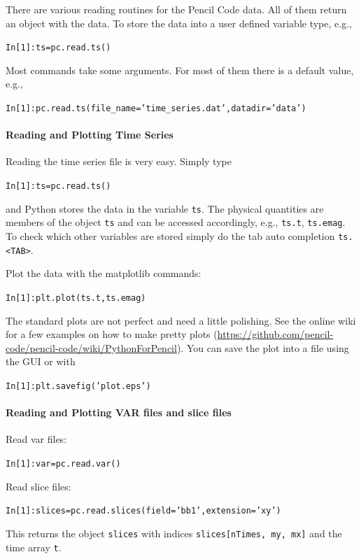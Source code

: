 \documentclass[\mydriver,12pt,twoside,notitlepage,a4paper]{article}
\begin{document}
There are various reading routines for the Pencil Code data.
All of them return an object with the data.
To store the data into a user defined variable type, e.g.,
\begin{alltt}
In [1]: ts = pc.read.ts()
\end{alltt}

Most commands take some arguments.
For most of them there is a default value, e.g.,
\begin{alltt}
In [1]: pc.read.ts(file_name='time_series.dat', datadir='data')
\end{alltt}

\paragraph{Reading and Plotting Time Series}
Reading the time series file is very easy.
Simply type
\begin{alltt}
In [1]: ts = pc.read.ts()
\end{alltt}
and Python stores the data in the variable \texttt{ts}.
The physical quantities are members of the object \texttt{ts} and can be accessed
accordingly, e.g., \texttt{ts.t}, \texttt{ts.emag}.
To check which other variables are stored simply do the tab auto completion \texttt{ts. <TAB>}.

Plot the data with the matplotlib commands:
\begin{alltt}
In [1]: plt.plot(ts.t, ts.emag)
\end{alltt}
The standard plots are not perfect and need a little polishing.
See the online wiki for a few examples on how to make pretty plots
(\url{https://github.com/pencil-code/pencil-code/wiki/PythonForPencil}).
You can save the plot into a file using the GUI or with
\begin{alltt}
In [1]: plt.savefig('plot.eps')
\end{alltt}

\paragraph{Reading and Plotting VAR files and slice files}
Read var files:
\begin{alltt}
In [1]: var = pc.read.var()
\end{alltt}
Read slice files:
\begin{alltt}
In [1]: slices = pc.read.slices(field='bb1', extension='xy')
\end{alltt}
This returns the object \texttt{slices} with indices \texttt{slices[nTimes, my, mx]}
and the time array \texttt{t}.
\end{document}
